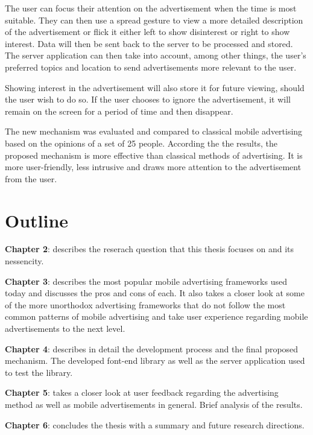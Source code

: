 The user can focus their attention on the advertisement when the time is most suitable. They can then use a spread gesture to view a more detailed description of the advertisement or flick it either left to show disinterest or right to show interest. Data will then be sent back to the server to be processed and stored. The server application can then take into account, among other things, the user's preferred topics and location to send advertisements more relevant to the user.

Showing interest in the advertisement will also store it for future viewing, should the user wish to do so. If the user chooses to ignore the advertisement, it will remain on the screen for a period of time and then disappear.

The new mechanism was evaluated and compared to classical mobile advertising based on the opinions of a set of 25 people. According the the results, the proposed mechanism is more effective than classical methods of advertising. It is more user-friendly, less intrusive and draws more attention to the advertisement from the user.

\section{Outline}

\noindent \textbf{Chapter 2}: describes the reserach question that this thesis focuses on and its nessencity.

\noindent \textbf{Chapter 3}: describes the most popular mobile advertising frameworks used today and discusses the pros and cons of each. It also takes a closer look at some of the more unorthodox advertising frameworks that do not follow the most common patterns of mobile advertising and take user experience regarding mobile advertisements to the next level.

\noindent \textbf{Chapter 4}: describes in detail the development process and the final proposed mechanism. The developed font-end library as well as the server application used to test the library.

\noindent \textbf{Chapter 5}: takes a closer look at user feedback regarding the advertising method as well as mobile advertisements in general. Brief analysis of the results.

\noindent \textbf{Chapter 6}: concludes the thesis with a summary and future research directions.